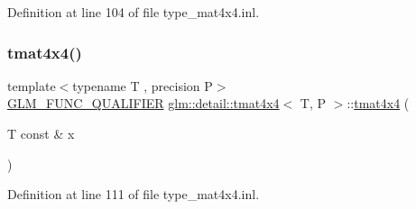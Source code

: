 Definition at line 104 of file type\+\_\+mat4x4.\+inl.

\mbox{\label{structglm_1_1detail_1_1tmat4x4_a265d71ebfc8a91f1b8d9104933799f49}} 
\subsubsection{\texorpdfstring{tmat4x4()}{tmat4x4()}\hspace{0.1cm}{\footnotesize\ttfamily [5/22]}}
{\footnotesize\ttfamily template$<$typename T , precision P$>$ \\
\hyperlink{setup_8hpp_a33fdea6f91c5f834105f7415e2a64407}{G\+L\+M\+\_\+\+F\+U\+N\+C\+\_\+\+Q\+U\+A\+L\+I\+F\+I\+ER} \hyperlink{structglm_1_1detail_1_1tmat4x4}{glm\+::detail\+::tmat4x4}$<$ T, P $>$\+::\hyperlink{structglm_1_1detail_1_1tmat4x4}{tmat4x4} (\begin{DoxyParamCaption}\item[{T const \&}]{x }\end{DoxyParamCaption})\hspace{0.3cm}{\ttfamily [explicit]}}



Definition at line 111 of file type\+\_\+mat4x4.\+inl.

\mbox{\label{structglm_1_1detail_1_1tmat4x4_a4d793b3d9f54148c86334948d7eef97a}} 
